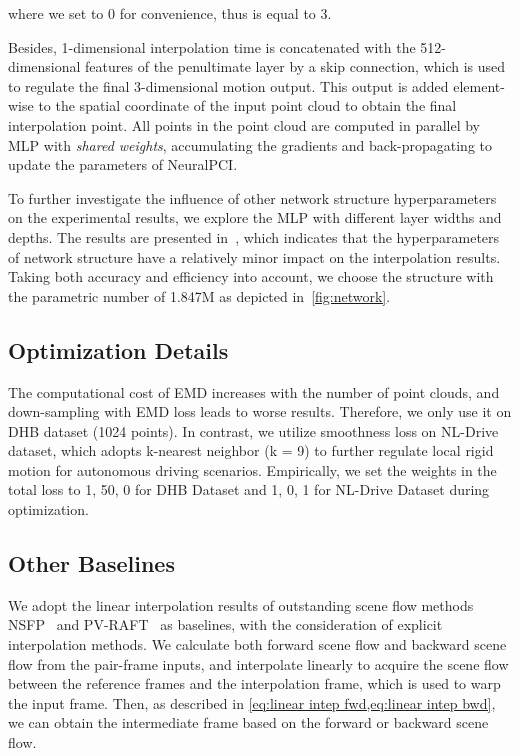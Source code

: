 \documentclass[10pt,twocolumn,letterpaper]{article}
\begin{document}
where we set  to 0 for convenience, thus  is equal to 3.

Besides, 1-dimensional interpolation time is concatenated with the 512-dimensional features of the penultimate layer by a skip connection, which is used to regulate the final 3-dimensional motion output. This output is added element-wise to the spatial coordinate of the input point cloud to obtain the final interpolation point. All points in the point cloud are computed in parallel by MLP with \textit{shared weights}, accumulating the gradients and back-propagating to update the parameters of NeuralPCI.

To further investigate the influence of other network structure hyperparameters on the experimental results, we explore the MLP with different layer widths and depths. The results are presented in~, which indicates that the hyperparameters of network structure have a relatively minor impact on the interpolation results. Taking both accuracy and efficiency into account, we choose the structure with the parametric number of 1.847M as depicted in~\cref{fig:network}.


\subsection{Optimization Details}
The computational cost of EMD increases with the number of point clouds, and down-sampling with EMD loss leads to worse results. Therefore, we only use it on DHB dataset (1024 points). In contrast, we utilize smoothness loss on NL-Drive dataset, which adopts k-nearest neighbor (k = 9) to further regulate local rigid motion for autonomous driving scenarios. Empirically, we set the weights  in the total loss to 1, 50, 0 for DHB Dataset and 1, 0, 1 for NL-Drive Dataset during optimization.  

 

\subsection{Other Baselines}
We adopt the linear interpolation results of outstanding scene flow methods NSFP~\cite{li2021neuralSF} and PV-RAFT~\cite{wei2021pv} as baselines, with the consideration of explicit interpolation methods. We calculate both forward scene flow  and backward scene flow  from the pair-frame inputs, and interpolate linearly to acquire the scene flow between the reference frames and the interpolation frame, which is used to warp the input frame. Then, as described in \cref{eq:linear intep fwd,eq:linear intep bwd}, we can obtain the intermediate frame based on the forward or backward scene flow.
\end{document}
